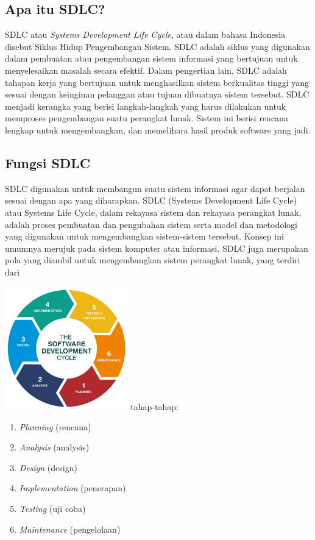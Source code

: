 \subsection{Apa itu SDLC?}
SDLC atau \emph{Systems Development Life Cycle}, atau  
dalam bahasa Indonesia disebut Siklus Hidup Pengembangan Sistem. SDLC adalah siklus yang 
digunakan dalam pembuatan atau pengembangan sistem informasi yang bertujuan untuk menyelesaikan
masalah secara efektif. Dalam pengertian lain, SDLC adalah tahapan kerja yang bertujuan untuk 
menghasilkan sistem berkualitas tinggi yang sesuai dengan keinginan pelanggan atau tujuan dibuatnya
sistem tersebut. SDLC menjadi kerangka yang berisi langkah-langkah yang harus dilakukan untuk 
memproses pengembangan suatu perangkat lunak. Sistem ini berisi rencana lengkap untuk mengembangkan, 
dan memelihara hasil produk software yang jadi.\cite{binus}

\subsection{Fungsi SDLC}
SDLC digunakan untuk membangun suatu sistem informasi agar dapat berjalan sesuai 
dengan apa yang diharapkan. SDLC (Systems Development Life Cycle) 
atau Systems Life Cycle, dalam rekayasa sistem dan rekayasa perangkat lunak, 
adalah proses pembuatan dan pengubahan sistem serta model dan metodologi yang digunakan untuk 
mengembangkan sistem-sistem tersebut. Konsep ini umumnya merujuk pada sistem komputer atau informasi. 
SDLC juga merupakan pola yang diambil untuk mengembangkan sistem perangkat lunak, yang terdiri dari 


\includegraphics[width=0.4\textwidth]{images/sdlc-cycle.jpg}
tahap-tahap: 


\begin{enumerate}
    \item \emph{Planning} (rencana)
    \item \emph{Analysis} (analysis)
    \item \emph{Design} (design)
    \item \emph{Implementation} (penerapan)
    \item \emph{Testing} (uji coba)
    \item \emph{Maintenance} (pengelolaan)
\end{enumerate}

